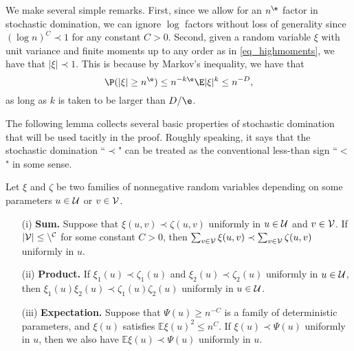 \documentclass[aos,preprint]{imsart}
\begin{document}
\begin{remark}We make several simple remarks.
First, since we allow for an $n^\e$ factor in stochastic domination, we can ignore $\log$ factors without loss of generality since $(\log n)^C\prec 1$ for any constant $C>0$.
Second, given a random variable $\xi$ with unit variance and finite moments up to any order as in \eqref{eq_highmoments}, we have that $|\xi|\prec 1$.
This is because by Markov's inequality, we have that
$$ \P(|\xi|\ge n^{\e})\le n^{-k\e}{\E |\xi|^k}\le n^{-D},$$
as long as $k$ is taken to be larger than $D/ \e$.
\end{remark}

The following lemma collects several basic properties of  stochastic domination that will be used tacitly in the proof. Roughly speaking, it says that the stochastic domination ``$\prec$" can be treated as  the conventional less-than sign ``$<$" in some sense.


\begin{lemma}\label{lem_stodomin}
Let $\xi$ and $\zeta$ be two families of nonnegative random variables depending on some parameters $u\in \cal U$ or $v\in \cal V$.
\begin{itemize}
\item[(i)] {\bf Sum.} Suppose that $\xi (u,v)\prec \zeta(u,v)$ uniformly in $u\in \cal U$ and $v\in \cal V$. If $|\cal V|\le n^C$ for some constant $C>0$, then $\sum_{v\in \cal V} \xi(u,v) \prec \sum_{v\in \cal V} \zeta(u,v)$ uniformly in $u$.

\item[(ii)] {\bf Product.} If $\xi_1 (u)\prec \zeta_1(u)$ and $\xi_2 (u)\prec  \zeta_2(u)$ uniformly in $u\in \cal U$, then $\xi_1(u)\xi_2(u) \prec \zeta_1(u) \zeta_2(u)$ uniformly in $u\in \cal U$.

\item[(iii)] {\bf Expectation.} Suppose that $\Psi(u)\ge n^{-C}$ is a family of deterministic parameters, and $\xi(u)$ satisfies $\mathbb E\xi(u)^2 \le n^C$. If $\xi(u)\prec \Psi(u)$ uniformly in $u$, then we also have $\mathbb E\xi(u) \prec \Psi(u)$ uniformly in $u$.
\end{itemize}
\end{lemma}
\end{document}

